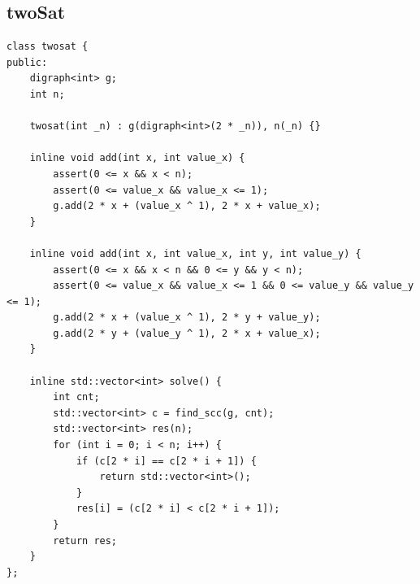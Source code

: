 \documentclass[twoside]{article}
\begin{document}
\subsection{twoSat}
\begin{lstlisting}
class twosat {
public:
    digraph<int> g;
    int n;
 
    twosat(int _n) : g(digraph<int>(2 * _n)), n(_n) {}
 
    inline void add(int x, int value_x) {
        assert(0 <= x && x < n);
        assert(0 <= value_x && value_x <= 1);
        g.add(2 * x + (value_x ^ 1), 2 * x + value_x);
    }
  
    inline void add(int x, int value_x, int y, int value_y) {
        assert(0 <= x && x < n && 0 <= y && y < n);
        assert(0 <= value_x && value_x <= 1 && 0 <= value_y && value_y <= 1);
        g.add(2 * x + (value_x ^ 1), 2 * y + value_y);
        g.add(2 * y + (value_y ^ 1), 2 * x + value_x);
    }
 
    inline std::vector<int> solve() {
        int cnt;
        std::vector<int> c = find_scc(g, cnt);
        std::vector<int> res(n);
        for (int i = 0; i < n; i++) {
            if (c[2 * i] == c[2 * i + 1]) {
                return std::vector<int>();
            }
            res[i] = (c[2 * i] < c[2 * i + 1]);
        }
        return res;
    }
};\end{lstlisting}
\end{document}
